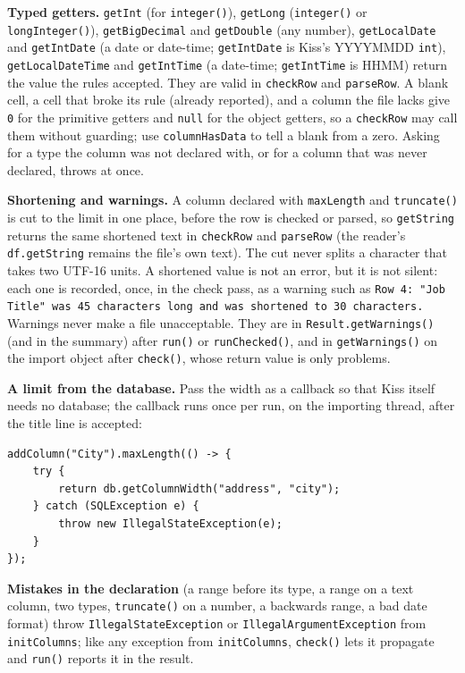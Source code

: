 \textbf{Typed getters.}  \texttt{getInt} (for \texttt{integer()}), \texttt{getLong} (\texttt{integer()} or \texttt{longInteger()}), \texttt{getBigDecimal} and \texttt{getDouble} (any number), \texttt{getLocalDate} and \texttt{getIntDate} (a date or date-time; \texttt{getIntDate} is Kiss's YYYYMMDD \texttt{int}), \texttt{getLocalDateTime} and \texttt{getIntTime} (a date-time; \texttt{getIntTime} is HHMM) return the value the rules accepted.  They are valid in \texttt{checkRow} and \texttt{parseRow}.  A blank cell, a cell that broke its rule (already reported), and a column the file lacks give \texttt{0} for the primitive getters and \texttt{null} for the object getters, so a \texttt{checkRow} may call them without guarding; use \texttt{columnHasData} to tell a blank from a zero.  Asking for a type the column was not declared with, or for a column that was never declared, throws at once.

\textbf{Shortening and warnings.}  A column declared with \texttt{maxLength} and \texttt{truncate()} is cut to the limit in one place, before the row is checked or parsed, so \texttt{getString} returns the same shortened text in \texttt{checkRow} and \texttt{parseRow} (the reader's \texttt{df.getString} remains the file's own text).  The cut never splits a character that takes two UTF-16 units.  A shortened value is not an error, but it is not silent: each one is recorded, once, in the check pass, as a warning such as \texttt{Row 4: "Job Title" was 45 characters long and was shortened to 30 characters.}  Warnings never make a file unacceptable.  They are in \texttt{Result.getWarnings()} (and in the summary) after \texttt{run()} or \texttt{runChecked()}, and in \texttt{getWarnings()} on the import object after \texttt{check()}, whose return value is only problems.

\textbf{A limit from the database.}  Pass the width as a callback so that Kiss itself needs no database; the callback runs once per run, on the importing thread, after the title line is accepted:

\begin{lstlisting}[style=java]
addColumn("City").maxLength(() -> {
    try {
        return db.getColumnWidth("address", "city");
    } catch (SQLException e) {
        throw new IllegalStateException(e);
    }
});
\end{lstlisting}

\textbf{Mistakes in the declaration} (a range before its type, a range on a text column, two types, \texttt{truncate()} on a number, a backwards range, a bad date format) throw \texttt{IllegalStateException} or \texttt{IllegalArgumentException} from \texttt{initColumns}; like any exception from \texttt{initColumns}, \texttt{check()} lets it propagate and \texttt{run()} reports it in the result.


